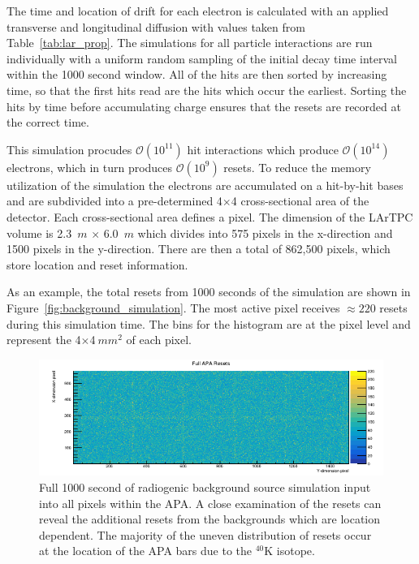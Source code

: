 The time and location of drift for each electron is calculated with an applied transverse and longitudinal diffusion with values taken from Table~\ref{tab:lar_prop}.
The simulations for all particle interactions are run individually with a uniform random sampling of the initial decay time interval within the 1000 second window.
All of the hits are then sorted by increasing time, so that the first hits read are the hits which occur the earliest.
Sorting the hits by time before accumulating charge ensures that the resets are recorded at the correct time.

This simulation procudes $\mathcal{O}(10^{11})$ hit interactions which produce $\mathcal{O}(10^{14})$ electrons, which in turn produces $\mathcal{O}(10^{9})$ resets.
To reduce the memory utilization of the simulation the electrons are accumulated on a hit-by-hit bases and are subdivided into a pre-determined 4$\times$4 cross-sectional area of the detector.
Each cross-sectional area defines a pixel.
The dimension of the LArTPC volume is 2.3~$\unit{m}$ $\times$ 6.0~$\unit{m}$ which divides into 575 pixels in the x-direction and 1500 pixels in the y-direction.
There are then a total of 862,500 pixels, which store location and reset information.

As an example, the total resets from 1000 seconds of the simulation are shown in Figure~\ref{fig:background_simulation}.
The most active pixel receives $\approx 220$ resets during this simulation time.
The bins for the histogram are at the pixel level and represent the 4$\times$4$~\unit{mm^{2}}$ of each pixel.

\begin{figure}[]
\centering
\includegraphics[width=\textwidth]{images/fullApaResets.png}
\caption{Full 1000 second of radiogenic background source simulation input into all pixels within the APA.
A close examination of the resets can reveal the additional resets from the backgrounds which are location dependent.
The majority of the uneven distribution of resets occur at the location of the APA bars due to the $^{40}$K isotope.
}
\end{figure}~\label{fig:background_simulation}

